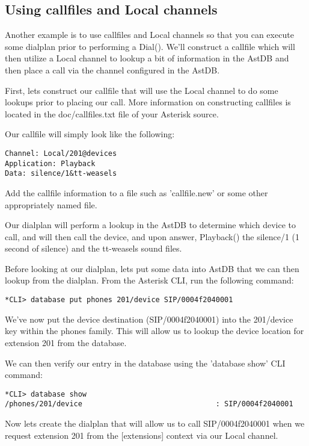 \subsection{Using callfiles and Local channels}

Another example is to use callfiles and Local channels so that you can execute
some dialplan prior to performing a Dial(). We'll construct a callfile which 
will then utilize a Local channel to lookup a bit of information in the AstDB 
and then place a call via the channel configured in the AstDB.

First, lets construct our callfile that will use the Local channel to do some
lookups prior to placing our call. More information on constructing callfiles is
located in the doc/callfiles.txt file of your Asterisk source.

Our callfile will simply look like the following:

\begin{verbatim}
Channel: Local/201@devices
Application: Playback
Data: silence/1&tt-weasels
\end{verbatim}

Add the callfile information to a file such as 'callfile.new' or some other
appropriately named file.

Our dialplan will perform a lookup in the AstDB to determine which device to
call, and will then call the device, and upon answer, Playback() the silence/1
(1 second of silence) and the tt-weasels sound files.

Before looking at our dialplan, lets put some data into AstDB that we can then
lookup from the dialplan. From the Asterisk CLI, run the following command:

\begin{verbatim}
*CLI> database put phones 201/device SIP/0004f2040001
\end{verbatim}

We've now put the device destination (SIP/0004f2040001) into the 201/device key
within the phones family. This will allow us to lookup the device location for
extension 201 from the database.

We can then verify our entry in the database using the 'database show' CLI
command:

\begin{verbatim}
*CLI> database show
/phones/201/device                               : SIP/0004f2040001
\end{verbatim}

Now lets create the dialplan that will allow us to call SIP/0004f2040001 when we
request extension 201 from the [extensions] context via our Local channel.

